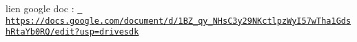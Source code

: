 lien google doc \+: \href{https://docs.google.com/document/d/1BZ_qy_NHsC3y29NKctlpzWyI57wTha1GdshRtaYb0RQ/edit?usp=drivesdk}{\texttt{ https\+://docs.\+google.\+com/document/d/1\+BZ\+\_\+qy\+\_\+\+NHs\+C3y29\+NKctlpz\+Wy\+I57w\+Tha1\+Gdsh\+Rta\+Yb0\+RQ/edit?usp=drivesdk}} 